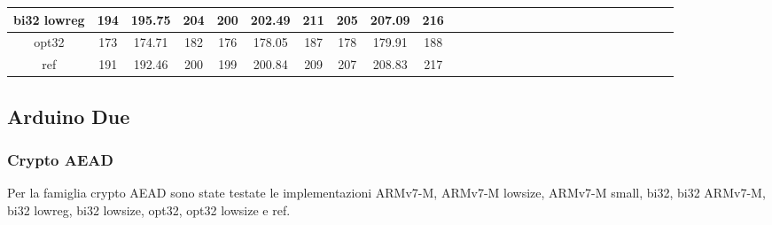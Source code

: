 \documentclass[12pt,a4paper,italian]{report}
\begin{document}
\begin{landscape}
\begin{table}[]
\begin{adjustbox}{width=600pt}
\begin{tabular}{|c|c|c|c|c|c|c|c|c|c|c|c|c|c|c|c|c|c|c|c|c|c|c|c|c|c|c|c|}
				\hline
				bi32 lowreg & 194 & 195.75 & 204 & 200 & 202.49 & 211 & 205 & 207.09 & 216 & & & & & & & & & & & & & & & & & & \\
				\hline
				opt32 & 173 & 174.71 & 182 & 176 & 178.05 & 187 & 178 & 179.91 & 188 & & & & & & & & & & & & & & & & & & \\
				\hline
				ref & 191 & 192.46 & 200 & 199 & 200.84 & 209 & 207 & 208.83 & 217 & & & & & & & & & & & & & & & & & & \\
				\hline
			\end{tabular}
		\end{adjustbox}
	\end{table}
\end{landscape}

\subsection{Arduino Due}

\subsubsection{Crypto AEAD}

Per la famiglia crypto AEAD sono state testate le implementazioni ARMv7-M, ARMv7-M lowsize, ARMv7-M small, bi32, bi32 ARMv7-M, bi32 lowreg, bi32 lowsize, opt32, opt32 lowsize e ref.
\end{document}

